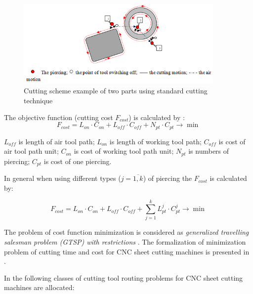 \documentclass[runningheads]{llncs}
\begin{document}
\begin{figure}
  \begin{center}
  \includegraphics[width=0.9\textwidth]{elements.png}
  \caption{Cutting scheme example of two parts using standard cutting technique}
  \label{elements}
  \end{center}
\end{figure}

The objective function
(cutting cost $F_{cost}$)
is calculated by \cite{ru04}:
\begin{equation}
F_{cost} =
L_{on} \cdot C_{on} +
L_{off} \cdot C_{off} +
N_{pt} \cdot C_{pt}
\to \min
\label{cost}
\end{equation}

$L_{off}$ is length of air tool path;
$L_{on}$ is length of working tool path;
$C_{off}$ is cost of air tool path unit;
$C_{on}$ is cost of working tool path unit;
$N_{pt}$ is numbers of piercing;
$C_{pt}$ is cost of one piercing.

In general when using different types ($j = \overline{1, k}$) of piercing
the $F_{cost}$ is calculated by:

\begin{equation}
  F_{cost} =
  L_{on} \cdot C_{on} +
  L_{off} \cdot C_{off} +
  \sum_{j=1}^k L_{pt}^j \cdot C_{pt}^j
  \to \min
  \label{cost-n}
\end{equation}

The problem of cost function minimization is considered as
\textit{generalized travelling salesman problem (GTSP) with restrictions}
\cite{ru04,ru05}.
The formalization of minimization problem of cutting time and cost
for CNC sheet cutting machines is presented in \cite{ru04}.

In \cite{Dewil2016Nov,Hoeft1997Sep,Petunin2015Nov}
the following classes of cutting tool routing problems
for CNC sheet cutting machines are allocated:
\end{document}
